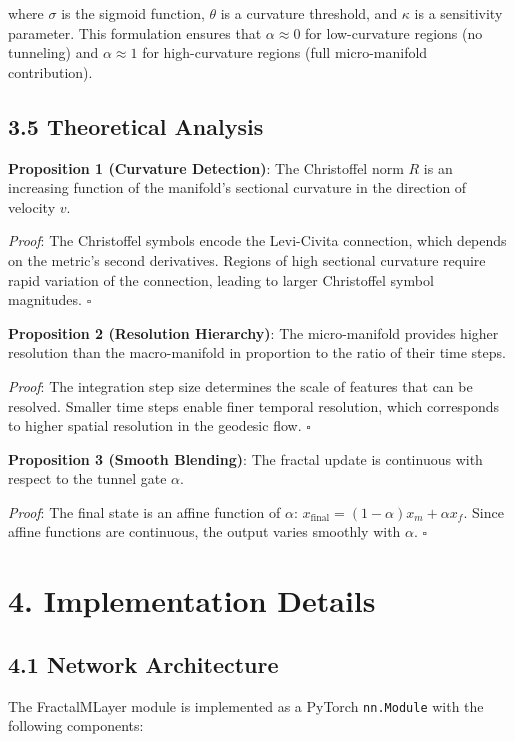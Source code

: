 \documentclass[12pt]{article}
\begin{document}
where $\sigma$ is the sigmoid function, $\theta$ is a curvature threshold, and $\kappa$ is a sensitivity parameter. This formulation ensures that $\alpha \approx 0$ for low-curvature regions (no tunneling) and $\alpha \approx 1$ for high-curvature regions (full micro-manifold contribution).

\subsection{3.5 Theoretical Analysis}

\textbf{Proposition 1 (Curvature Detection)}: The Christoffel norm $R$ is an increasing function of the manifold's sectional curvature in the direction of velocity $v$.

\textit{Proof}: The Christoffel symbols encode the Levi-Civita connection, which depends on the metric's second derivatives. Regions of high sectional curvature require rapid variation of the connection, leading to larger Christoffel symbol magnitudes. $\square$

\textbf{Proposition 2 (Resolution Hierarchy)}: The micro-manifold provides higher resolution than the macro-manifold in proportion to the ratio of their time steps.

\textit{Proof}: The integration step size determines the scale of features that can be resolved. Smaller time steps enable finer temporal resolution, which corresponds to higher spatial resolution in the geodesic flow. $\square$

\textbf{Proposition 3 (Smooth Blending)}: The fractal update is continuous with respect to the tunnel gate $\alpha$.

\textit{Proof}: The final state is an affine function of $\alpha$: $x_\text{final} = (1-\alpha)x_m + \alpha x_f$. Since affine functions are continuous, the output varies smoothly with $\alpha$. $\square$

\section{4. Implementation Details}

\subsection{4.1 Network Architecture}

The FractalMLayer module is implemented as a PyTorch \texttt{nn.Module} with the following components:
\end{document}
